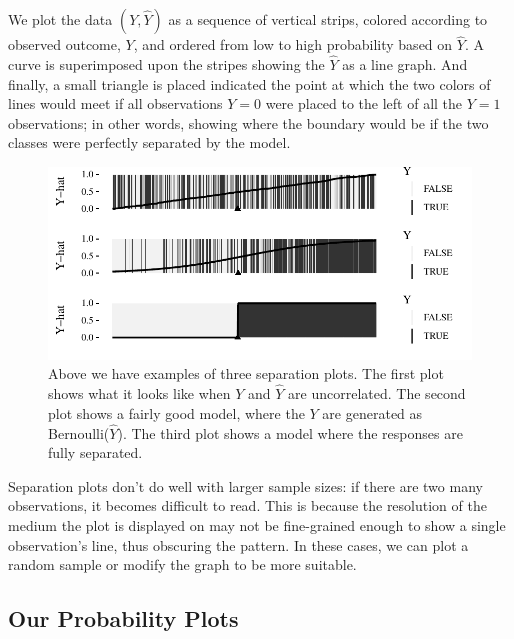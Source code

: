 \documentclass[12pt,twoside]{reedthesis}
\begin{document}
  We plot the data \((Y, \hat{Y})\) as a sequence of vertical strips,
  colored according to observed outcome, \(Y\), and ordered from low to
  high probability based on \(\hat{Y}\). A curve is superimposed upon the
  stripes showing the \(\hat{Y}\) as a line graph. And finally, a small
  triangle is placed indicated the point at which the two colors of lines
  would meet if all observations \(Y = 0\) were placed to the left of all
  the \(Y=1\) observations; in other words, showing where the boundary
  would be if the two classes were perfectly separated by the model.
  
  \begin{figure}[tbh]
  \centering
  \includegraphics[angle = 0,scale = 1]{figure/sep_plot_examples.pdf}
  \caption[Above we have examples of three separation plots. The first plot shows
  what it looks like when $Y$ and $\hat{Y}$ are uncorrelated. The second plot 
  shows a fairly good model, where the $Y$ are generated as Bernoulli($\hat{Y}$).
  The third plot shows a model where the responses are fully separated.]{\normalsize{Above we have examples of three separation plots. The first plot shows
  what it looks like when $Y$ and $\hat{Y}$ are uncorrelated. The second plot 
  shows a fairly good model, where the $Y$ are generated as Bernoulli($\hat{Y}$).
  The third plot shows a model where the responses are fully separated.}}
  \label{fig:sep-plot-examples}
  \end{figure}
  
  Separation plots don't do well with larger sample sizes: if there are
  two many observations, it becomes difficult to read. This is because the
  resolution of the medium the plot is displayed on may not be
  fine-grained enough to show a single observation's line, thus obscuring
  the pattern. In these cases, we can plot a random sample or modify the
  graph to be more suitable.
  
  \subsection{Our Probability Plots}\label{our-probability-plots}
  
\end{document}
